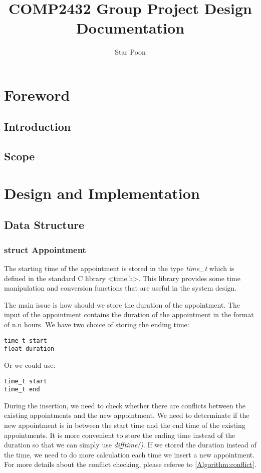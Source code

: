 \documentclass[12pt,a4paper]{report}
\author{Star Poon}
\title{COMP2432 Group Project Design Documentation}
\begin{document}
\maketitle
\chapter{Foreword}
\section{Introduction}
\section{Scope}
\chapter{Design and Implementation}
\section{Data Structure}
\subsection{struct Appointment}
The starting time of the appointment is stored in the type \textit{time\_t} which is defined in the standard C library \textless time.h\textgreater. This library provides some time manipulation and conversion functions that are useful in the system design.

The main issue is how should we store the duration of the appointment. The input of the appointment contains the duration of the appointment in the format of n.n hours. We have two choice of storing the ending time:
\begin{lstlisting}
time_t start
float duration
\end{lstlisting}
Or we could use:
\begin{lstlisting}
time_t start
time_t end
\end{lstlisting}

During the insertion, we need to check whether there are conflicts between the existing appointments and the new appointment. We need to determinate if the new appointment is in between the start time and the end time of the existing appointments. It is more convenient to store the ending time instead of the duration so that we can simply use \textit{difftime()}. If we stored the duration instead of the time, we need to do more calculation each time we insert a new appointment. For more details about the conflict checking, please referee to \autoref{Algorithm:conflict}.
\end{document}
